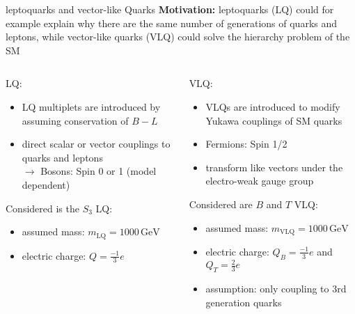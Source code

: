 \documentclass[aspectratio=1610, professionalfonts, 9pt]{beamer}
\begin{document}
\begin{frame}{leptoquarks and vector-like Quarks}
    \textbf{Motivation:}
    leptoquarks (LQ) could for example explain why there are the same number of generations of quarks and leptons,
    while vector-like quarks (VLQ) could solve the hierarchy problem of the SM
    \vspace{3mm}
    \begin{columns}[t]
        \begin{column}{0.5\textwidth}
            LQ:
            \begin{itemize}
                \item LQ multiplets are introduced by assuming conservation of \(B-L\)
                \item direct scalar or vector couplings to quarks and leptons \\
                \(\rightarrow\) Bosons: Spin 0 or 1 (model dependent)
            \end{itemize}
            Considered is the \(S_3\) LQ:
            \begin{itemize}
                \item assumed mass: \(m_{\mathrm{LQ}}=1000\,\mathrm{GeV}\)
                \item electric charge: \(Q=\frac{-1}{3}e\)
            \end{itemize}
        \end{column}
        \begin{column}{0.5\textwidth}
            VLQ:
            \begin{itemize}
                \item VLQs are introduced to modify Yukawa couplings of SM quarks
                \item Fermions: Spin 1/2
                \item transform like vectors under the electro-weak gauge group
            \end{itemize}
            Considered are \(B\) and \(T\) VLQ:
            \begin{itemize}
                \item assumed mass: \(m_{\mathrm{VLQ}}=1000\,\mathrm{GeV}\)
                \item electric charge: \(Q_{B}=\frac{-1}{3}e\) and \(Q_{T}=\frac{2}{3}e\)
                \item assumption: only coupling to 3rd generation quarks
            \end{itemize}
        \end{column}
    \end{columns}
\end{frame}
\end{document}
